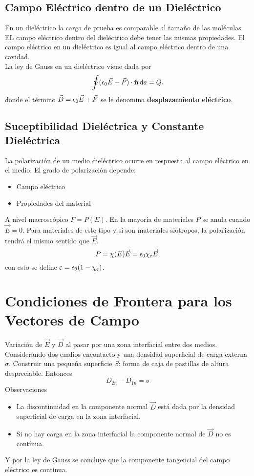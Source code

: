 \subsection{Campo Eléctrico dentro de un Dieléctrico}
En un dieléctrico la carga de prueba es comparable al tamaño de las moléculas. EL campo eléctrico dentro del dieléctrico debe tener las mismas propiedades. El campo eléctrico en un dieléctrico es igual al campo eléctrico dentro de una cavidad. \\

La ley de Gauss en un dieléctrico viene dada por
\begin{equation}
	\oint (\epsilon_0 \vec{E} + \vec{P}) \cdot \vu{n} \dd{a} = Q.
\end{equation}
donde el término $\vec{D} = \epsilon_0 \vec{E} + \vec{P}$ se le denomina \textbf{desplazamiento eléctrico}. 


\subsection{Suceptibilidad Dieléctrica y Constante Dieléctrica}
La polarización de un medio dieléctrico ocurre en respuesta al campo eléctrico en el medio. El grado de polarización depende:
\begin{itemize}
	\item Campo eléctrico
	\item Propiedades del material
\end{itemize}
A nivel macroscópico $F = P(E)$. En la mayoría de materiales $P$ se anula cuando $\vec{E} = 0$. Para materiales de este tipo y si son materiales siótropos, la polarización tendrá el mismo sentido que $\vec{E}$. 
\begin{equation}
	P = \chi (E) \vec{E} = \epsilon_0 \chi _e \vec{E}.
\end{equation}
con esto se define $\varepsilon = \epsilon_0 (1 - \chi _e)$.


\section{Condiciones de Frontera para los Vectores de Campo}
Variación de $\vec{E}$ y $\vec{D}$ al pasar por una zona interfacial entre dos medios. Considerando dos emdios encontacto y una densidad superficial de carga externa $\sigma$. Construir una pequeña superficie $S$: forma de caja de pastillas de altura despreciable. Entonces
\begin{equation}
	D_{2n} - D_{1n} = \sigma
\end{equation}
Observaciones
\begin{itemize}
	\item La discontinuidad en la componente normal $\vec{D}$ está dada por la densidad superficial de carga en la zona interfacial.
	\item Si no hay carga en la zona interfacial la componente normal de $\vec{D}$ no es contínua.
\end{itemize}
Y por la ley de Gauss se concluye que la componente tangencial del campo eléctrico es continua.



